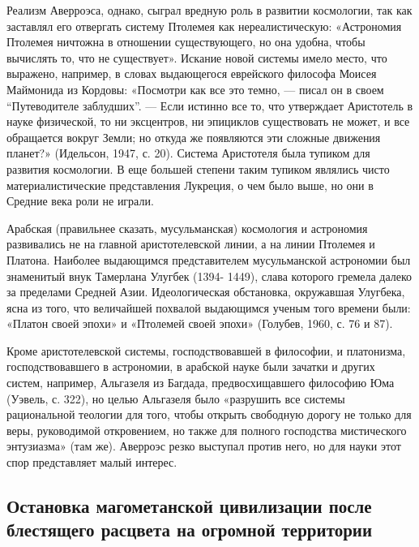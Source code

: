 Реализм Аверроэса, однако, сыграл вредную роль в развитии космологии,
так как заставлял его отвергать систему Птолемея как нереалистическую:
«Астрономия Птолемея ничтожна в отношении существующего, но она
удобна, чтобы вычислять то, что не существует». Искание новой системы
имело место, что выражено, например, в словах выдающегося еврейского
философа Моисея Маймонида из Кордовы: «Посмотри как все это темно, ---
писал он в своем ``Путеводителе заблудших''. --- Если истинно все то,
что утверждает Аристотель в науке физической, то ни эксцентров, ни
эпициклов существовать не может, и все обращается вокруг Земли; но
откуда же появляются эти сложные движения планет?» (Идельсон, 1947, с.
20). Система Аристотеля была тупиком для развития космологии. В еще
большей степени таким тупиком являлись чисто материалистические
представления Лукреция, о чем было выше, но они в Средние века роли не
играли.

Арабская (правильнее сказать, мусульманская) космология и астрономия
развивались не на главной аристотелевской линии, а на линии Птолемея и
Платона. Наиболее выдающимся представителем мусульманской астрономии
был знаменитый внук Тамерлана Улугбек (1394- 1449), слава которого
гремела далеко за пределами Средней Азии. Идеологическая обстановка,
окружавшая Улугбека, ясна из того, что величайшей похвалой выдающимся
ученым того времени были: «Платон своей эпохи» и «Птолемей своей
эпохи» (Голубев, 1960, с. 76 и 87).

Кроме аристотелевской системы, господствовавшей в философии, и
платонизма, господствовавшего в астрономии, в арабской науке были
зачатки и других систем, например, Альгазеля из Багдада,
предвосхищавшего философию Юма (Уэвель, с. 322), но целью Альгазеля
было «разрушить все системы рациональной теологии для того, чтобы
открыть свободную дорогу не только для веры, руководимой откровением,
но также для полного господства мистического энтузиазма» (там же).
Аверроэс резко выступал против него, но для науки этот спор
представляет малый интерес.

\subsection{Остановка магометанской цивилизации после блестящего
расцвета на огромной территории}

